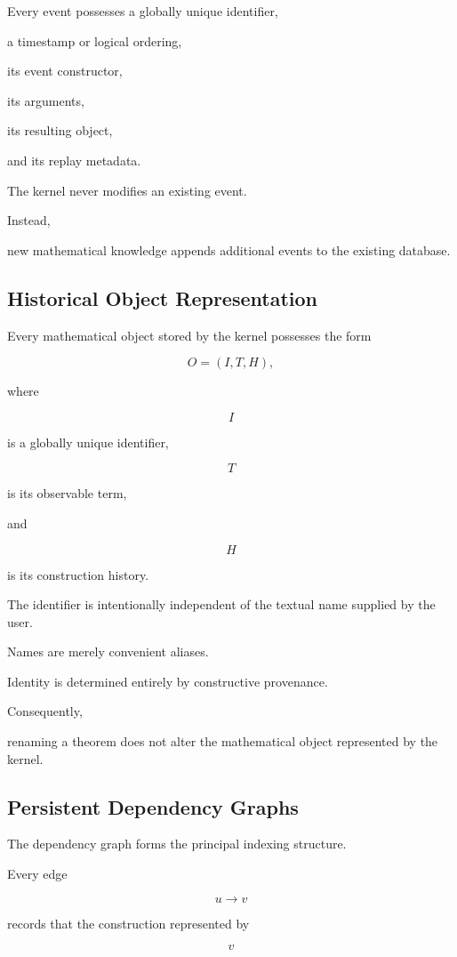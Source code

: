\documentclass[12pt,oneside]{article}
\theoremstyle{definition}
\theoremstyle{remark}
\begin{document}
Every event possesses a globally unique identifier,

a timestamp or logical ordering,

its event constructor,

its arguments,

its resulting object,

and its replay metadata.

The kernel never modifies an existing event.

Instead,

new mathematical knowledge appends additional events to the existing database.

\subsection{Historical Object Representation}

Every mathematical object stored by the kernel possesses the form

\[
O
=
(I,T,H),
\]

where

\[
I
\]

is a globally unique identifier,

\[
T
\]

is its observable term,

and

\[
H
\]

is its construction history.

The identifier is intentionally independent of the textual name supplied by the
user.

Names are merely convenient aliases.

Identity is determined entirely by constructive provenance.

Consequently,

renaming a theorem does not alter the mathematical object represented by the
kernel.

\subsection{Persistent Dependency Graphs}

The dependency graph forms the principal indexing structure.

Every edge

\[
u
\rightarrow
v
\]

records that the construction represented by

\[
v
\]
\end{document}
